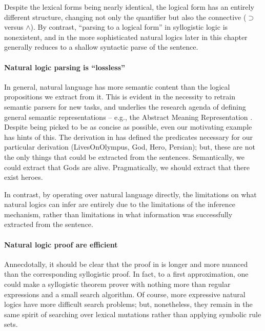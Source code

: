 Despite the lexical forms being nearly identical, the logical form has an entirely different
  structure, changing not only the quantifier but also the connective ($\supset$ versus $\land$).
By contrast, ``parsing to a logical form'' in syllogistic logic is nonexistent, and
  in the more sophisticated natural logics later in this chapter generally reduces to a
  shallow syntactic parse of the sentence.

\paragraph{Natural logic parsing is ``lossless''}
In general, natural language has more semantic content than the logical propositions we
  extract from it.
This is evident in the necessity to retrain semantic parsers for new tasks, and underlies
  the research agenda of defining general semantic representations -- e.g., the Abstract Meaning
  Representation \cite{key:2013banarescu-amr}.
Despite being picked to be as concise as possible, even our motivating example
  has hints of this.
The derivation in  has defined the predicates necessary
  for our particular derivation (LivesOnOlympus, God, Hero, Persian); but, these are not
  the only things that could be extracted from the sentences.
Semantically, we could extract that Gods are alive.
Pragmatically, we should extract that there exist heroes.

In contrast, by operating over natural language directly, the limitations on what
  natural logics can infer are entirely due to the limitations of the inference
  mechanism, rather than limitations in what information was successfully extracted
  from the sentence.

\paragraph{Natural logic proof are efficient}
Annecdotally, it should be clear that the proof in  is
  longer and more nuanced than the corresponding syllogistic proof.
In fact, to a first approximation, one could make a syllogistic theorem prover with
  nothing more than regular expressions and a small search algorithm.
Of course, more expressive natural logics have more difficult search problems;
  but, nonetheless, they remain in the same spirit of searching over lexical mutations
  rather than applying symbolic rule sets.

